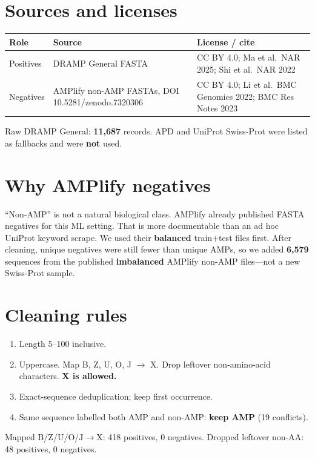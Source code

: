 \documentclass[11pt,a4paper]{report}
\begin{document}
\section{Sources and licenses}

\begin{tabular}{llp{}}
\toprule
Role & Source & License / cite \\
\midrule
Positives & DRAMP General FASTA & CC BY 4.0; Ma et al.\ NAR 2025; Shi et al.\ NAR 2022 \\
Negatives & AMPlify non-AMP FASTAs, DOI 10.5281/zenodo.7320306 & CC BY 4.0; Li et al.\ BMC Genomics 2022; BMC Res Notes 2023 \\
\bottomrule
\end{tabular}

Raw DRAMP General: \textbf{11{,}687} records. APD and UniProt Swiss-Prot were listed as fallbacks and were \textbf{not} used.

\section{Why AMPlify negatives}

``Non-AMP'' is not a natural biological class. AMPlify already published FASTA negatives for this ML setting. That is more documentable than an ad hoc UniProt keyword scrape. We used their \textbf{balanced} train+test files first. After cleaning, unique negatives were still fewer than unique AMPs, so we added \textbf{6{,}579} sequences from the published \textbf{imbalanced} AMPlify non-AMP files---not a new Swiss-Prot sample.

\section{Cleaning rules}

\begin{enumerate}
\item Length 5--100 inclusive.
\item Uppercase. Map B, Z, U, O, J $\rightarrow$ X. Drop leftover non-amino-acid characters. \textbf{X is allowed.}
\item Exact-sequence deduplication; keep first occurrence.
\item Same sequence labelled both AMP and non-AMP: \textbf{keep AMP} (19 conflicts).
\end{enumerate}

Mapped B/Z/U/O/J$\rightarrow$X: 418 positives, 0 negatives. Dropped leftover non-AA: 48 positives, 0 negatives.
\end{document}
